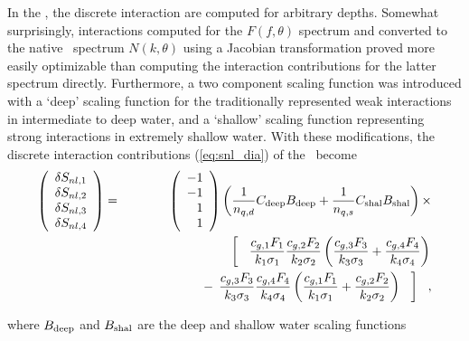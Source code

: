 In the \gmd, the discrete interaction are computed for arbitrary depths.
Somewhat surprisingly, interactions computed for the $F(f, \theta)$ spectrum
and converted to the native \ws\ spectrum $N(k, \theta)$ using a Jacobian
transformation proved more easily optimizable than computing the interaction
contributions for the latter spectrum directly. Furthermore, a two component
scaling function was introduced with a `deep' scaling function for the
traditionally represented weak interactions in intermediate to deep water, and
a `shallow' scaling function representing strong interactions in extremely
shallow water. With these modifications, the discrete interaction
contributions (\ref{eq:snl_dia}) of the \dia\ become
\begin{eqnarray}
\left ( \begin{array}{c}
  \delta S_{nl,1} \\ \delta S_{nl,2} \\ \delta S_{nl,3} \\ \delta S_{nl,4} 
\end{array} \right )  & = &  
\left ( \begin{array}{r} -1 \\  -1 \\ 1 \\ 1 \end{array} \right )
  \left ( \frac{1}{n_{q,d}} C_{\rm{deep}} B_{\rm{deep}} + 
          \frac{1}{n_{q,s}} C_{\rm{shal}} B_{\rm{shal}} \right ) \times \nonumber \\
 &  & \hspace{20mm} \left [ \:\:\:\:
                    \frac{c_{g,1}F_1}{k_1 \sigma_1} 
                    \frac{c_{g,2}F_2}{k_2 \sigma_2} \left ( 
                    \frac{c_{g,3}F_3}{k_3 \sigma_3} +
                    \frac{c_{g,4}F_4}{k_4 \sigma_4} \right )
                                                         \right . \nonumber \\
 &  &  \hspace{20mm} \left . - \:\:
                    \frac{c_{g,3}F_3}{k_3 \sigma_3} 
                    \frac{c_{g,4}F_4}{k_4 \sigma_4} \left ( 
                    \frac{c_{g,1}F_1}{k_1 \sigma_1} + 
                    \frac{c_{g,2}F_2}{k_2 \sigma_2} \right ) \:\:\:\:
                                                    \right ] \:\:\:
, \label{eq:gmd_dsnl} 
\end{eqnarray}

\noindent
where $B_{\rm{deep}}$ and $B_{\rm{shal}}$ are the deep and shallow water
scaling functions


